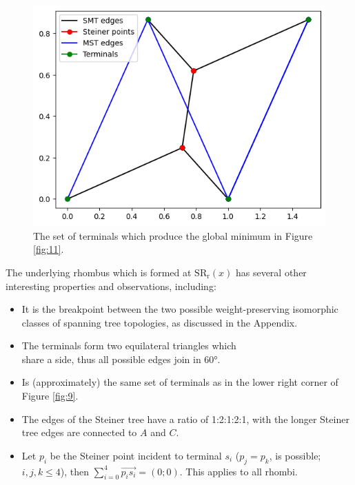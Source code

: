 \documentclass{mpaper}
\begin{document}
\begin{figure}[h!]
  \begin{center}
  \includegraphics[scale=0.5]{plot11.png}
  \end{center}
  \caption{\label{fig:12} The set of terminals which produce the global minimum in Figure \ref{fig:11}.}
\end{figure}

The underlying rhombus which is formed at $\operatorname{SR_r}(x)$ has several other interesting properties and observations, including:
\begin{itemize}
  \item It is the breakpoint between the two possible weight-preserving isomorphic classes of spanning tree topologies, as discussed in the Appendix. %
  \item The terminals form two equilateral triangles which\\share a side, thus all possible edges join in 60°.
  \item Is (approximately) the same set of terminals as in the lower right corner of Figure \ref{fig:9}.
  \item The edges of the Steiner tree have a ratio of 1:2:1:2:1, with the longer Steiner tree edges are connected to $A$ and $C$. 
  \item Let $p_i$ be the Steiner point incident to terminal $s_i$ ($p_j=p_k$, is possible; $i,j,k \leq 4$), then $\sum\limits_{i=0}^4\overrightarrow{p_is_i}=(0;0)$. This applies to all rhombi.
\end{itemize}
\end{document}
